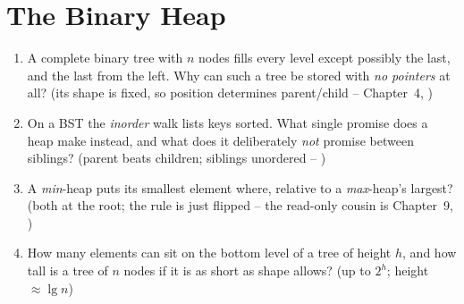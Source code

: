\section{The Binary Heap}\label{sec:c07-heap}

\begin{previouslybox}
\begin{enumerate}[nosep, leftmargin=1.6em]
  \item A complete binary tree with $n$ nodes fills every level except possibly the last, and the last
        from the left. Why can such a tree be stored with \emph{no pointers} at all? (its shape is fixed,
        so position determines parent/child -- Chapter~4, )
  \item On a BST the \emph{inorder} walk lists keys sorted. What single promise does a heap make instead,
        and what does it deliberately \emph{not} promise between siblings? (parent beats children; siblings
        unordered -- )
  \item A \emph{min}-heap puts its smallest element where, relative to a \emph{max}-heap's largest? (both
        at the root; the rule is just flipped -- the read-only cousin is Chapter~9, )
  \item How many elements can sit on the bottom level of a tree of height $h$, and how tall is a tree of
        $n$ nodes if it is as short as shape allows? (up to $2^{h}$; height $\approx\lg n$)
\end{enumerate}
\end{previouslybox}

